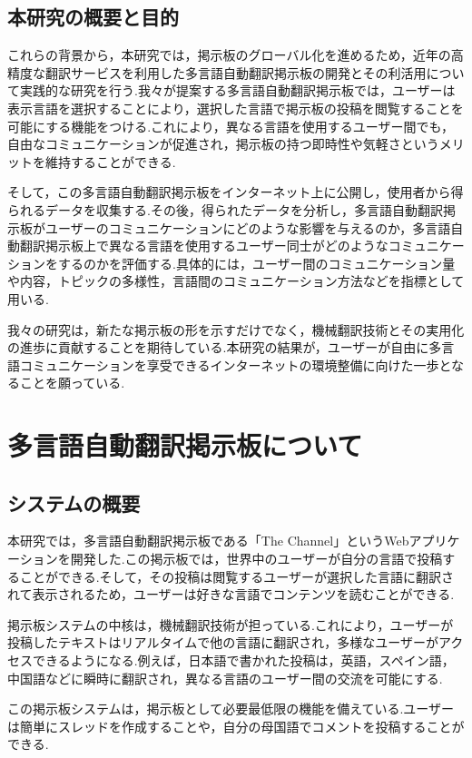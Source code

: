 \documentclass[b5paper,12pt,dvipdfmx]{jsreport}
\begin{document}
\section{本研究の概要と目的}

これらの背景から，本研究では，掲示板のグローバル化を進めるため，近年の高精度な翻訳サービスを利用した多言語自動翻訳掲示板の開発とその利活用について実践的な研究を行う.我々が提案する多言語自動翻訳掲示板では，ユーザーは表示言語を選択することにより，選択した言語で掲示板の投稿を閲覧することを可能にする機能をつける.これにより，異なる言語を使用するユーザー間でも，自由なコミュニケーションが促進され，掲示板の持つ即時性や気軽さというメリットを維持することができる.

そして，この多言語自動翻訳掲示板をインターネット上に公開し，使用者から得られるデータを収集する.その後，得られたデータを分析し，多言語自動翻訳掲示板がユーザーのコミュニケーションにどのような影響を与えるのか，多言語自動翻訳掲示板上で異なる言語を使用するユーザー同士がどのようなコミュニケーションをするのかを評価する.具体的には，ユーザー間のコミュニケーション量や内容，トピックの多様性，言語間のコミュニケーション方法などを指標として用いる.

我々の研究は，新たな掲示板の形を示すだけでなく，機械翻訳技術とその実用化の進歩に貢献することを期待している.本研究の結果が，ユーザーが自由に多言語コミュニケーションを享受できるインターネットの環境整備に向けた一歩となることを願っている.


\chapter{多言語自動翻訳掲示板について}
\section{システムの概要}

本研究では，多言語自動翻訳掲示板である「The Channel」というWebアプリケーションを開発した.この掲示板では，世界中のユーザーが自分の言語で投稿することができる.そして，その投稿は閲覧するユーザーが選択した言語に翻訳されて表示されるため，ユーザーは好きな言語でコンテンツを読むことができる.

掲示板システムの中核は，機械翻訳技術が担っている.これにより，ユーザーが投稿したテキストはリアルタイムで他の言語に翻訳され，多様なユーザーがアクセスできるようになる.例えば，日本語で書かれた投稿は，英語，スペイン語，中国語などに瞬時に翻訳され，異なる言語のユーザー間の交流を可能にする.

この掲示板システムは，掲示板として必要最低限の機能を備えている.ユーザーは簡単にスレッドを作成することや，自分の母国語でコメントを投稿することができる.
\end{document}
